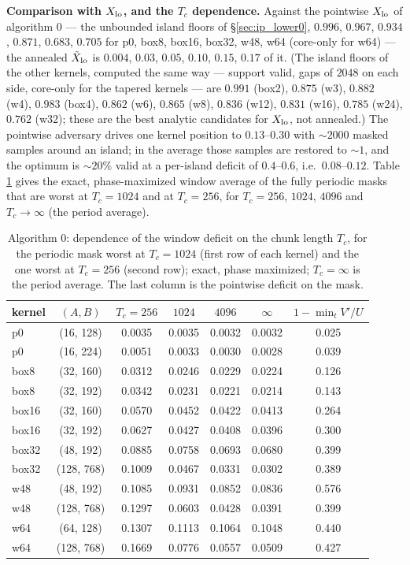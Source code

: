 \documentclass{article}
\numberwithin{equation}{section}   %
\begin{document}
{\bf Comparison with $X_{\rm lo}$, and the $T_c$ dependence.}  Against the pointwise $X_{\rm lo}$ of
algorithm 0 --- the unbounded island floors of \S\ref{sec:ip_lower0}, $0.996$, $0.967$, $0.934$, $0.871$,
$0.683$, $0.705$ for p0, box8, box16, box32, w48, w64 (core-only for w64) --- the annealed
$\tilde X_{\rm lo}$ is $0.004$, $0.03$, $0.05$, $0.10$, $0.15$, $0.17$ of it.  (The island floors of the
other kernels, computed the same way --- support valid, gaps of $2048$ on each side, core-only for the
tapered kernels --- are $0.991$ (box2), $0.875$ (w3), $0.882$ (w4), $0.983$ (box4), $0.862$ (w6), $0.865$
(w8), $0.836$ (w12), $0.831$ (w16), $0.785$ (w24), $0.762$ (w32); these are the best analytic candidates
for $X_{\rm lo}$, not annealed.)  The pointwise adversary drives one kernel position to $0.13$--$0.30$
with $\sim 2000$ masked samples around an island; in the average those samples are restored to $\sim 1$,
and the optimum is $\sim 20\%$ valid at a per-island deficit of $0.4$--$0.6$, i.e.\ $0.08$--$0.12$.  Table
\ref{tab:ip_fom_Tc} gives the exact, phase-maximized window average of the fully periodic masks that are
worst at $T_c = 1024$ and at $T_c = 256$, for $T_c = 256$, $1024$, $4096$ and $T_c \rightarrow \infty$
(the period average).

\begin{table}[ht]
\centering\small
\begin{tabular}{l c cccc c}
\toprule
kernel & $(A, B)$ & $T_c = 256$ & $1024$ & $4096$ & $\infty$ & $1 - \min_t V'/U$ \\
\midrule
p0    & (16, 128)  & 0.0035 & 0.0035 & 0.0032 & 0.0032 & 0.025 \\
p0    & (16, 224)  & 0.0051 & 0.0033 & 0.0030 & 0.0028 & 0.039 \\
box8  & (32, 160)  & 0.0312 & 0.0246 & 0.0229 & 0.0224 & 0.126 \\
box8  & (32, 192)  & 0.0342 & 0.0231 & 0.0221 & 0.0214 & 0.143 \\
box16 & (32, 160)  & 0.0570 & 0.0452 & 0.0422 & 0.0413 & 0.264 \\
box16 & (32, 192)  & 0.0627 & 0.0427 & 0.0408 & 0.0396 & 0.300 \\
box32 & (48, 192)  & 0.0885 & 0.0758 & 0.0693 & 0.0680 & 0.399 \\
box32 & (128, 768) & 0.1009 & 0.0467 & 0.0331 & 0.0302 & 0.389 \\
w48   & (48, 192)  & 0.1085 & 0.0931 & 0.0852 & 0.0836 & 0.576 \\
w48   & (128, 768) & 0.1297 & 0.0603 & 0.0428 & 0.0391 & 0.399 \\
w64   & (64, 128)  & 0.1307 & 0.1113 & 0.1064 & 0.1048 & 0.440 \\
w64   & (128, 768) & 0.1669 & 0.0776 & 0.0557 & 0.0509 & 0.427 \\
\bottomrule
\end{tabular}
\caption{Algorithm 0: dependence of the window deficit on the chunk length $T_c$, for the periodic mask
worst at $T_c = 1024$ (first row of each kernel) and the one worst at $T_c = 256$ (second row); exact,
phase maximized; $T_c = \infty$ is the period average.  The last column is the pointwise deficit on the
mask.}
\label{tab:ip_fom_Tc}
\end{table}
\end{document}
